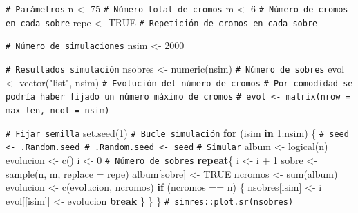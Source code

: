 \documentclass[
  10pt,
]{book}
\newenvironment{Shaded}{\begin{snugshade}}{\end{snugshade}}
\newcommand{\AttributeTok}[1]{\textcolor[rgb]{0.77,0.63,0.00}{#1}}
\newcommand{\CommentTok}[1]{\textcolor[rgb]{0.56,0.35,0.01}{\textit{#1}}}
\newcommand{\ConstantTok}[1]{\textcolor[rgb]{0.00,0.00,0.00}{#1}}
\newcommand{\ControlFlowTok}[1]{\textcolor[rgb]{0.13,0.29,0.53}{\textbf{#1}}}
\newcommand{\DecValTok}[1]{\textcolor[rgb]{0.00,0.00,0.81}{#1}}
\newcommand{\FunctionTok}[1]{\textcolor[rgb]{0.00,0.00,0.00}{#1}}
\newcommand{\NormalTok}[1]{#1}
\newcommand{\OtherTok}[1]{\textcolor[rgb]{0.56,0.35,0.01}{#1}}
\newcommand{\SpecialCharTok}[1]{\textcolor[rgb]{0.00,0.00,0.00}{#1}}
\newcommand{\StringTok}[1]{\textcolor[rgb]{0.31,0.60,0.02}{#1}}
\theoremstyle{break}
\theoremstyle{nonumberplain}
\renewcommand{\CommentTok}[1]{\textcolor[rgb]{0.41,0.41,0.41}{\texttt{#1}}}
\begin{document}
\begin{Shaded}
\begin{Highlighting}[]
\CommentTok{\# Parámetros}
\NormalTok{n }\OtherTok{\textless{}{-}} \DecValTok{75} \CommentTok{\# Número total de cromos}
\NormalTok{m }\OtherTok{\textless{}{-}} \DecValTok{6}  \CommentTok{\# Número de cromos en cada sobre}
\NormalTok{repe }\OtherTok{\textless{}{-}} \ConstantTok{TRUE} \CommentTok{\# Repetición de cromos en cada sobre}

\CommentTok{\# Número de simulaciones}
\NormalTok{nsim }\OtherTok{\textless{}{-}} \DecValTok{2000}

\CommentTok{\# Resultados simulación}
\NormalTok{nsobres }\OtherTok{\textless{}{-}} \FunctionTok{numeric}\NormalTok{(nsim)      }\CommentTok{\# Número de sobres}
\NormalTok{evol }\OtherTok{\textless{}{-}} \FunctionTok{vector}\NormalTok{(}\StringTok{"list"}\NormalTok{, nsim)  }\CommentTok{\# Evolución del número de cromos}
\CommentTok{\# Por comodidad se podría haber fijado un número máximo de cromos}
\CommentTok{\# evol \textless{}{-} matrix(nrow = max\_len, ncol = nsim)}

\CommentTok{\# Fijar semilla}
\FunctionTok{set.seed}\NormalTok{(}\DecValTok{1}\NormalTok{)}
\CommentTok{\# Bucle simulación}
\ControlFlowTok{for}\NormalTok{ (isim }\ControlFlowTok{in} \DecValTok{1}\SpecialCharTok{:}\NormalTok{nsim) \{}
  \CommentTok{\# seed \textless{}{-} .Random.seed \# .Random.seed \textless{}{-} seed}
  \CommentTok{\# Simular}
\NormalTok{  album }\OtherTok{\textless{}{-}} \FunctionTok{logical}\NormalTok{(n)}
\NormalTok{  evolucion }\OtherTok{\textless{}{-}} \FunctionTok{c}\NormalTok{()}
\NormalTok{  i }\OtherTok{\textless{}{-}} \DecValTok{0} \CommentTok{\# Número de sobres}
  \ControlFlowTok{repeat}\NormalTok{\{}
\NormalTok{    i }\OtherTok{\textless{}{-}}\NormalTok{ i }\SpecialCharTok{+} \DecValTok{1}
\NormalTok{    sobre }\OtherTok{\textless{}{-}} \FunctionTok{sample}\NormalTok{(n, m, }\AttributeTok{replace =}\NormalTok{ repe)}
\NormalTok{    album[sobre] }\OtherTok{\textless{}{-}} \ConstantTok{TRUE}
\NormalTok{    ncromos }\OtherTok{\textless{}{-}} \FunctionTok{sum}\NormalTok{(album)}
\NormalTok{    evolucion }\OtherTok{\textless{}{-}} \FunctionTok{c}\NormalTok{(evolucion, ncromos)}
    \ControlFlowTok{if}\NormalTok{ (ncromos }\SpecialCharTok{==}\NormalTok{ n) \{}
\NormalTok{      nsobres[isim] }\OtherTok{\textless{}{-}}\NormalTok{ i}
\NormalTok{      evol[[isim]] }\OtherTok{\textless{}{-}}\NormalTok{ evolucion}
      \ControlFlowTok{break}
\NormalTok{    \}}
\NormalTok{  \}}
\NormalTok{\}}
\CommentTok{\# simres::plot.sr(nsobres)}
\end{Highlighting}
\end{Shaded}
\end{document}
